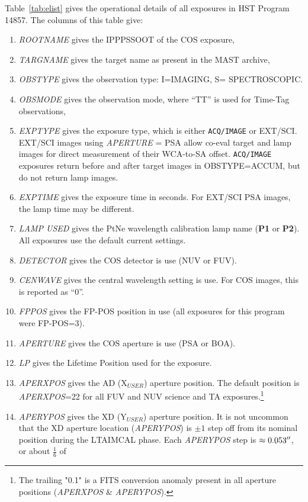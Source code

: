 \documentclass[12pt]{reportj}
\def\arcsec{\hbox{$^{\prime\prime}$}}
\newcommand{\plampone}{{\bf P1}}
\newcommand{\plamptwo}{{\bf P2}}
\newcommand{\fsw}[1]{{\textsc LTA#1}}
\newcommand{\tacq}[1]{\texttt{ACQ/#1}}
\begin{document}
Table~\ref{tab:elist} gives the operational details of all  exposures in HST Program 14857. The columns of this table give:
\footnotesize
\begin{enumerate}
\item \textit{ROOTNAME} gives the IPPPSSOOT of the COS exposure,
\item \textit{TARGNAME} gives the target name as present in the MAST archive,
\item \textit{OBSTYPE} gives the observation type: I=IMAGING, S= SPECTROSCOPIC.
\item \textit{OBSMODE} gives the observation mode, where ``TT'' is used for Time-Tag observations,
\item \textit{EXPTYPE} gives the exposure type, which is either \tacq{IMAGE} or EXT/SCI. EXT/SCI images using \textit{APERTURE} = PSA allow co-eval target and lamp images for direct measurement of their WCA-to-SA offset. \tacq{IMAGE} exposures return before and after target images in \textsc{OBSTYPE}=ACCUM, but do not return lamp images.
\item \textit{EXPTIME} gives the exposure time in seconds. For EXT/SCI PSA images, the lamp time may be different.
\item \textit{LAMP USED} gives the PtNe wavelength calibration lamp name (\plampone{} or \plamptwo{}). All exposures use the default current settings.
\item \textit{DETECTOR} gives the COS detector is use (NUV or FUV).
\item \textit{CENWAVE} gives the central wavelength setting is use. For COS images, this is reported as ``0''.
\item \textit{FPPOS} gives the FP-POS position in use (all exposures for this program were FP-POS=3).
\item \textit{APERTURE} gives the COS aperture is use (PSA or BOA).
\item \textit{LP} gives the Lifetime Position used for the exposure.
\item \textit{APERXPOS} gives the AD (X$_{USER}$) aperture position. The default position is \textit{APERXPOS}=22 for all FUV and NUV science and TA exposures.\footnote{The trailing "0.1" is a FITS conversion anomaly present in all aperture positions (\textit{APERXPOS} \& \textit{APERYPOS}).}
\item \textit{APERYPOS} gives the XD (Y$_{USER}$) aperture position. It is not uncommon that the XD aperture location (\textit{APERYPOS}) is $\pm 1$ step off from its nominal position during the \fsw{IMCAL} phase. Each \textit{APERYPOS} step is $\approx0.053\arcsec$, or about $\frac{1}{6}$ of

\end{enumerate}
\end{document}
